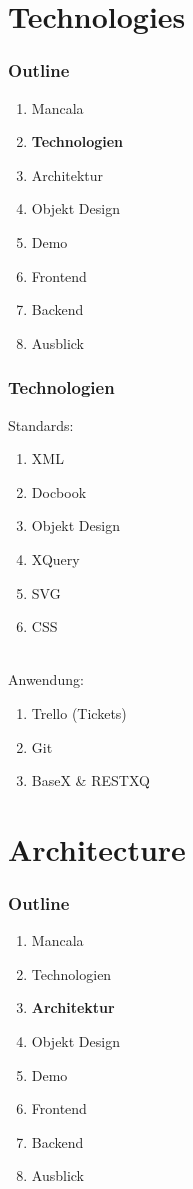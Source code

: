 \documentclass[
	10pt,
	t		%
]{beamer}
\begin{document}
\section{Technologies}
\begin{frame}
\frametitle{Outline}
\begin{enumerate}
\item Mancala
\item \textbf{Technologien}
\item Architektur
\item Objekt Design
\item Demo
\item Frontend
\item Backend
\item Ausblick
\end{enumerate}
\end{frame}

\begin{frame}
\frametitle{Technologien}
Standards:
\begin{enumerate}
	\item XML
	\item Docbook
	\item Objekt Design
	\item XQuery
	\item SVG
	\item CSS
\end{enumerate}
\hfill \\[0.4cm]
Anwendung:
\begin{enumerate}
	\item Trello (Tickets)
	\item Git
	\item BaseX \& RESTXQ
\end{enumerate}
\end{frame}

\section{Architecture}
\begin{frame}
\frametitle{Outline}
\begin{enumerate}
\item Mancala
\item Technologien
\item \textbf{Architektur}
\item Objekt Design
\item Demo
\item Frontend
\item Backend
\item Ausblick
\end{enumerate}
\end{frame}
\end{document}
